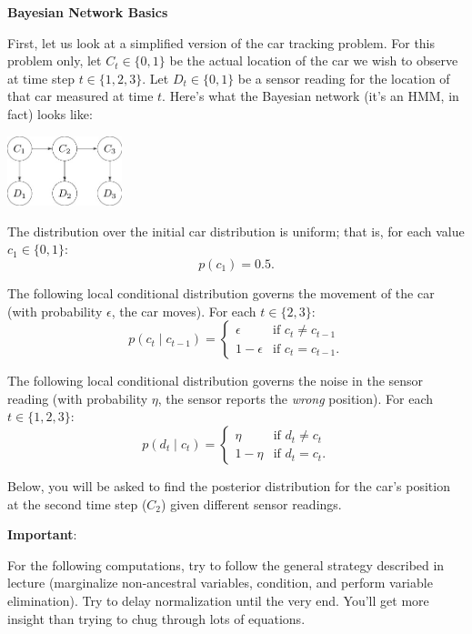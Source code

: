 \item {\bf Bayesian Network Basics}

First, let us look at a simplified version of the car tracking problem. For this
problem only, let $C_t \in \{0, 1\}$ be the actual location of the car we wish
to observe at time step $t \in \{1, 2, 3\}$. Let $D_t \in \{0, 1\}$ be a sensor
reading for the location of that car measured at time $t$. Here's what the
Bayesian network (it's an HMM, in fact) looks like:
\begin{center}
\includegraphics[width=0.25\textwidth]{media/car.jpeg}
\end{center}

The distribution over the initial car distribution is uniform; that is, for each
value $c_1 \in \{0, 1\}$:
\[ p(c_1) = 0.5. \]

The following local conditional distribution governs the movement of the car
(with probability $\epsilon$, the car moves). For each $t \in \{2, 3\}$:
\[ p(c_t \mid c_{t-1}) =
\begin{cases}
  \epsilon & \text{if $c_t \neq c_{t-1}$} \\
  1-\epsilon & \text{if $c_t = c_{t-1}$}.
\end{cases}
\]

The following local conditional distribution governs the noise in the sensor
reading (with probability $\eta$, the sensor reports the {\em wrong} position).
For each $t \in \{1, 2, 3\}$:
\[
p(d_t \mid c_t) =
\begin{cases}
  \eta & \text{if $d_t \neq c_t$} \\
  1-\eta & \text{if $d_t = c_t$}.
\end{cases}
\]

Below, you will be asked to find the posterior distribution for the car's
position at the second time step ($C_2$) given different sensor readings.

{\bf Important}:

For the following computations, try to follow the general strategy described in
lecture (marginalize non-ancestral variables, condition, and perform variable
elimination). Try to delay normalization until the very end. You'll get more
insight than trying to chug through lots of equations.

\begin{enumerate}

  

  

  

\end{enumerate}
